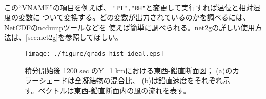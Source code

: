 \\

\noindent この``VNAME''の項目を例えば、
\verb|"PT","RH"|と変更して実行すれば温位と相対湿度の変数に
ついて変換する。どの変数が出力されているのかを調べるには、NetCDFのncdumpツールなどを
使えば簡単に調べられる。net2gの詳しい使用方法は、\ref{sec:net2g}を参照してほしい。


\begin{figure}[t]
\begin{center}
  \texttt{[image: ./figure/grads\_hist\_ideal.eps]}\\
  \caption{積分開始後 1200 sec のY=1 kmにおける東西-鉛直断面図；
           (a)のカラーシェードは全凝結物の混合比、
           (b)は鉛直速度をそれぞれ示す。ベクトルは東西-鉛直断面内の風の流れを表す。}
  \label{fig_ideal}
\end{center}
\end{figure}



